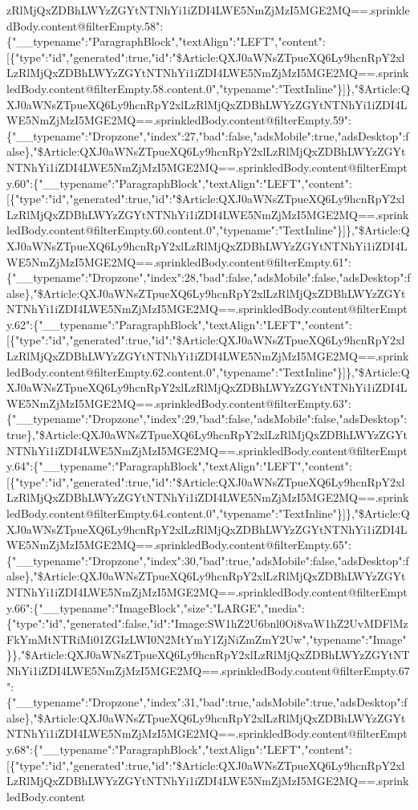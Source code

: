 zRlMjQxZDBhLWYzZGYtNTNhYi1iZDI4LWE5NmZjMzI5MGE2MQ==.sprinkledBody.content@filterEmpty.58":\{"\_\_typename":"ParagraphBlock","textAlign":"LEFT","content":{[}\{"type":"id","generated":true,"id":"\$Article:QXJ0aWNsZTpueXQ6Ly9hcnRpY2xlLzRlMjQxZDBhLWYzZGYtNTNhYi1iZDI4LWE5NmZjMzI5MGE2MQ==.sprinkledBody.content@filterEmpty.58.content.0","typename":"TextInline"\}{]}\},"\$Article:QXJ0aWNsZTpueXQ6Ly9hcnRpY2xlLzRlMjQxZDBhLWYzZGYtNTNhYi1iZDI4LWE5NmZjMzI5MGE2MQ==.sprinkledBody.content@filterEmpty.59":\{"\_\_typename":"Dropzone","index":27,"bad":false,"adsMobile":true,"adsDesktop":false\},"\$Article:QXJ0aWNsZTpueXQ6Ly9hcnRpY2xlLzRlMjQxZDBhLWYzZGYtNTNhYi1iZDI4LWE5NmZjMzI5MGE2MQ==.sprinkledBody.content@filterEmpty.60":\{"\_\_typename":"ParagraphBlock","textAlign":"LEFT","content":{[}\{"type":"id","generated":true,"id":"\$Article:QXJ0aWNsZTpueXQ6Ly9hcnRpY2xlLzRlMjQxZDBhLWYzZGYtNTNhYi1iZDI4LWE5NmZjMzI5MGE2MQ==.sprinkledBody.content@filterEmpty.60.content.0","typename":"TextInline"\}{]}\},"\$Article:QXJ0aWNsZTpueXQ6Ly9hcnRpY2xlLzRlMjQxZDBhLWYzZGYtNTNhYi1iZDI4LWE5NmZjMzI5MGE2MQ==.sprinkledBody.content@filterEmpty.61":\{"\_\_typename":"Dropzone","index":28,"bad":false,"adsMobile":false,"adsDesktop":false\},"\$Article:QXJ0aWNsZTpueXQ6Ly9hcnRpY2xlLzRlMjQxZDBhLWYzZGYtNTNhYi1iZDI4LWE5NmZjMzI5MGE2MQ==.sprinkledBody.content@filterEmpty.62":\{"\_\_typename":"ParagraphBlock","textAlign":"LEFT","content":{[}\{"type":"id","generated":true,"id":"\$Article:QXJ0aWNsZTpueXQ6Ly9hcnRpY2xlLzRlMjQxZDBhLWYzZGYtNTNhYi1iZDI4LWE5NmZjMzI5MGE2MQ==.sprinkledBody.content@filterEmpty.62.content.0","typename":"TextInline"\}{]}\},"\$Article:QXJ0aWNsZTpueXQ6Ly9hcnRpY2xlLzRlMjQxZDBhLWYzZGYtNTNhYi1iZDI4LWE5NmZjMzI5MGE2MQ==.sprinkledBody.content@filterEmpty.63":\{"\_\_typename":"Dropzone","index":29,"bad":false,"adsMobile":false,"adsDesktop":true\},"\$Article:QXJ0aWNsZTpueXQ6Ly9hcnRpY2xlLzRlMjQxZDBhLWYzZGYtNTNhYi1iZDI4LWE5NmZjMzI5MGE2MQ==.sprinkledBody.content@filterEmpty.64":\{"\_\_typename":"ParagraphBlock","textAlign":"LEFT","content":{[}\{"type":"id","generated":true,"id":"\$Article:QXJ0aWNsZTpueXQ6Ly9hcnRpY2xlLzRlMjQxZDBhLWYzZGYtNTNhYi1iZDI4LWE5NmZjMzI5MGE2MQ==.sprinkledBody.content@filterEmpty.64.content.0","typename":"TextInline"\}{]}\},"\$Article:QXJ0aWNsZTpueXQ6Ly9hcnRpY2xlLzRlMjQxZDBhLWYzZGYtNTNhYi1iZDI4LWE5NmZjMzI5MGE2MQ==.sprinkledBody.content@filterEmpty.65":\{"\_\_typename":"Dropzone","index":30,"bad":true,"adsMobile":false,"adsDesktop":false\},"\$Article:QXJ0aWNsZTpueXQ6Ly9hcnRpY2xlLzRlMjQxZDBhLWYzZGYtNTNhYi1iZDI4LWE5NmZjMzI5MGE2MQ==.sprinkledBody.content@filterEmpty.66":\{"\_\_typename":"ImageBlock","size":"LARGE","media":\{"type":"id","generated":false,"id":"Image:SW1hZ2U6bnl0Oi8vaW1hZ2UvMDFlMzFkYmMtNTRiMi01ZGIzLWI0N2MtYmY1ZjNiZmZmY2Uw","typename":"Image"\}\},"\$Article:QXJ0aWNsZTpueXQ6Ly9hcnRpY2xlLzRlMjQxZDBhLWYzZGYtNTNhYi1iZDI4LWE5NmZjMzI5MGE2MQ==.sprinkledBody.content@filterEmpty.67":\{"\_\_typename":"Dropzone","index":31,"bad":true,"adsMobile":true,"adsDesktop":false\},"\$Article:QXJ0aWNsZTpueXQ6Ly9hcnRpY2xlLzRlMjQxZDBhLWYzZGYtNTNhYi1iZDI4LWE5NmZjMzI5MGE2MQ==.sprinkledBody.content@filterEmpty.68":\{"\_\_typename":"ParagraphBlock","textAlign":"LEFT","content":{[}\{"type":"id","generated":true,"id":"\$Article:QXJ0aWNsZTpueXQ6Ly9hcnRpY2xlLzRlMjQxZDBhLWYzZGYtNTNhYi1iZDI4LWE5NmZjMzI5MGE2MQ==.sprinkledBody.content